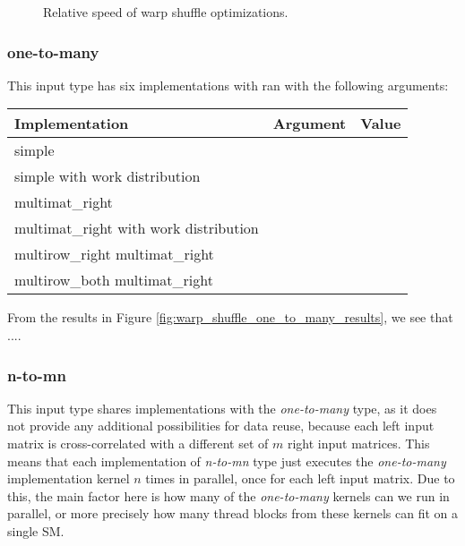 \begin{figure}[ht]
	\centering
	\def\svgwidth{0.5\textwidth}
	
	\caption{Relative speed of warp shuffle optimizations.}
	\label{fig:warp_shuffle_one_to_one_results}
\end{figure}



\subsubsection{one-to-many}
This input type has six implementations with ran with the following arguments:

\begin{center}
	\begin{tabular}{|l|l|c|} 
		\hline
		Implementation&Argument&Value\\ [0.5ex] 
		\hline\hline
		simple & & \\
		\hline
		simple with work distribution & & \\
		\hline
		multimat\_right & & \\
		\hline
		multimat\_right with work distribution & & \\
		\hline
		multirow\_right multimat\_right & & \\
		\hline
		multirow\_both multimat\_right & & \\
		\hline
	\end{tabular}
\end{center}

From the results in Figure \ref{fig:warp_shuffle_one_to_many_results}, we see that ....



\subsubsection{n-to-mn}
This input type shares implementations with the \textit{one-to-many} type, as it does not provide any additional possibilities for data reuse, because each left input matrix is cross-correlated with a different set of $m$ right input matrices. This means that each implementation of \textit{n-to-mn} type just executes the \textit{one-to-many} implementation kernel $n$ times in parallel, once for each left input matrix. Due to this, the main factor here is how many of the \textit{one-to-many} kernels can we run in parallel, or more precisely how many thread blocks from these kernels can fit on a single SM.

